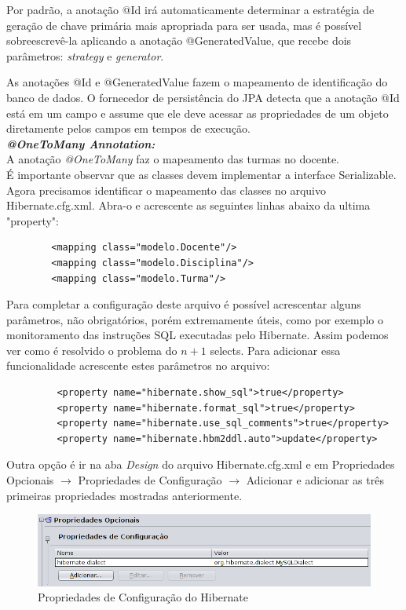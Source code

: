 \documentclass[12pt,a4paper]{article}
\begin{document}
Por padrão, a anotação @Id irá automaticamente determinar a estratégia de geração de chave primária mais apropriada para ser usada, mas é possível sobreescrevê-la aplicando a anotação @GeneratedValue, que recebe dois parâmetros: \textit{strategy} e \textit{generator}.


As anotações @Id e @GeneratedValue fazem o mapeamento de identificação do banco de dados. O fornecedor de persistência do JPA detecta que a anotação @Id está em um campo e assume que ele deve acessar as propriedades de um objeto diretamente pelos campos em tempos de execução.\\

\textit{\textbf{@OneToMany Annotation:}}\\
A anotação \textit{@OneToMany} faz o mapeamento das turmas no docente.\\

É importante observar que as classes devem implementar a interface Serializable.
Agora precisamos identificar o mapeamento das classes no arquivo Hibernate.cfg.xml. Abra-o e acrescente as seguintes linhas abaixo da ultima "property":

\begin{lstlisting}
 		<mapping class="modelo.Docente"/>
        <mapping class="modelo.Disciplina"/>
        <mapping class="modelo.Turma"/>
\end{lstlisting}

Para completar a configuração deste arquivo é possível acrescentar alguns parâmetros, não obrigatórios, porém extremamente úteis, como por exemplo o monitoramento das instruções SQL executadas pelo Hibernate. Assim podemos ver como é resolvido o problema do $n+1$ selects. Para adicionar essa funcionalidade acrescente estes parâmetros no arquivo:
\begin{lstlisting}
		 <property name="hibernate.show_sql">true</property>
		 <property name="hibernate.format_sql">true</property>
		 <property name="hibernate.use_sql_comments">true</property>
		 <property name="hibernate.hbm2ddl.auto">update</property>
\end{lstlisting}


Outra opção é ir na aba \textit{Design} do arquivo Hibernate.cfg.xml e em Propriedades Opcionais $\rightarrow$ Propriedades de Configuração $\rightarrow$ Adicionar e adicionar as três primeiras propriedades mostradas anteriormente. 

\begin{figure} [!h]
\centering 
\includegraphics[width=0.7\linewidth]{2.png}
\caption{Propriedades de Configuração do Hibernate}
\label{fig:2}
\end{figure}
\end{document}

